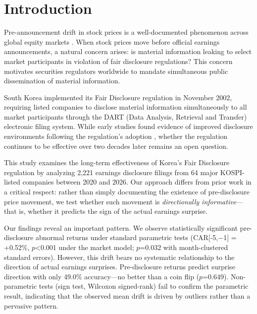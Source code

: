 \documentclass[manuscript,review]{acmart}
\begin{document}


\maketitle

\section{Introduction}

Pre-announcement drift in stock prices is a well-documented phenomenon across global equity markets \cite{kaniel2012individual}. When stock prices move before official earnings announcements, a natural concern arises: is material information leaking to select market participants in violation of fair disclosure regulations? This concern motivates securities regulators worldwide to mandate simultaneous public dissemination of material information.

South Korea implemented its Fair Disclosure regulation in November 2002, requiring listed companies to disclose material information simultaneously to all market participants through the DART (Data Analysis, Retrieval and Transfer) electronic filing system. While early studies found evidence of improved disclosure environments following the regulation's adoption \cite{yun2012fair, park2020disclosure}, whether the regulation continues to be effective over two decades later remains an open question.

This study examines the long-term effectiveness of Korea's Fair Disclosure regulation by analyzing 2,221 earnings disclosure filings from 64 major KOSPI-listed companies between 2020 and 2026. Our approach differs from prior work in a critical respect: rather than simply documenting the existence of pre-disclosure price movement, we test whether such movement is \textit{directionally informative}---that is, whether it predicts the sign of the actual earnings surprise.

Our findings reveal an important pattern. We observe statistically significant pre-disclosure abnormal returns under standard parametric tests (CAR[-5,$-$1] = +0.52\%, $p$<0.001 under the market model; $p$=0.032 with month-clustered standard errors). However, this drift bears no systematic relationship to the direction of actual earnings surprises. Pre-disclosure returns predict surprise direction with only 49.0\% accuracy---no better than a coin flip ($p$=0.649). Non-parametric tests (sign test, Wilcoxon signed-rank) fail to confirm the parametric result, indicating that the observed mean drift is driven by outliers rather than a pervasive pattern.
\end{document}
